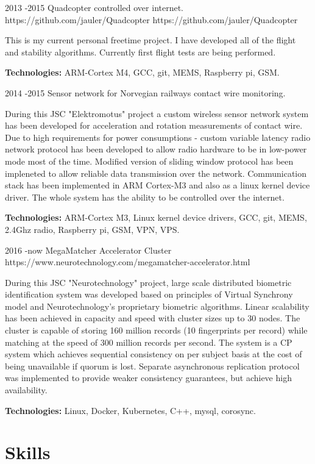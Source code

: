 \documentclass[12]{article}
\begin{document}
\job
{2013 -}{2015}
{Quadcopter controlled over internet.}
{https://github.com/jauler/Quadcopter}
{https://github.com/jauler/Quadcopter}
{
This is my current personal freetime project.
I have developed all of the flight and stability algorithms.
Currently first flight tests are being performed.\\
\rule{0mm}{5mm}\textbf{Technologies:} ARM-Cortex M4, GCC, git, MEMS, Raspberry pi, GSM.}

\job
{2014 -}{2015}
{Sensor network for Norvegian railways contact wire monitoring.}
{}
{}
{
During this JSC "Elektromotus" project a custom wireless sensor network system has been developed for acceleration and rotation measurements of contact wire.
Due to high requirements for power consumptions - custom variable latency radio network protocol has been developed to allow radio hardware to be in low-power mode most of the time.
Modified version of sliding window protocol has been impleneted to allow reliable data transmission over the network.
Communication stack has been implemented in ARM Cortex-M3 and also as a linux kernel device driver.
The whole system has the ability to be controlled over the internet.\\
\rule{0mm}{5mm}\textbf{Technologies:} ARM-Cortex M3, Linux kernel device drivers, GCC, git, MEMS, 2.4Ghz radio, Raspberry pi, GSM, VPN, VPS.}

\job
{2016 -}{now}
{MegaMatcher Accelerator Cluster}
{https://www.neurotechnology.com/megamatcher-accelerator.html}
{}
{
During this JSC "Neurotechnology" project, large scale distributed biometric identification system was developed based on principles of Virtual Synchrony model and Neurotechnology's proprietary biometric algorithms.
Linear scalability has been achieved in capacity and speed with cluster sizes up to 30 nodes.
The cluster is capable of storing 160 million records (10 fingerprints per record) while matching at the speed of 300 million records per second.
The system is a CP system which achieves sequential consistency on per subject basis at the cost of being unavailable if quorum is lost.
Separate asynchronous replication protocol was implemented to provide weaker consistency guarantees, but achieve high availability.\\
\rule{0mm}{5mm}\textbf{Technologies:} Linux, Docker, Kubernetes, C++, mysql, corosync.}


\section{Skills}
\end{document}
